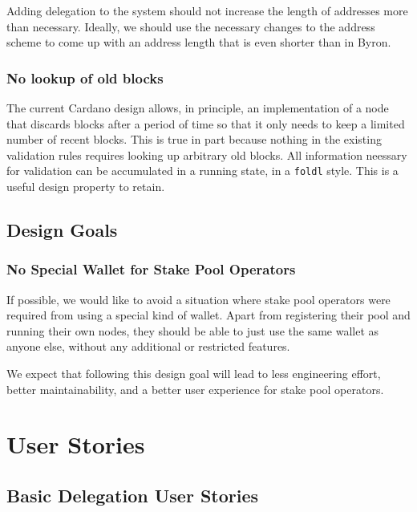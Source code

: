 \documentclass[11pt,a4paper]{article}
\begin{document}
Adding delegation to the system should not increase the length of
addresses more than necessary. Ideally, we should use the necessary
changes to the address scheme to come up with an address length that is
even shorter than in Byron.

\subsubsection{No lookup of old blocks}\label{no-lookup-of-old-blocks}

The current Cardano design allows, in principle, an implementation of a
node that discards blocks after a period of time so that it only needs
to keep a limited number of recent blocks. This is true in part because
nothing in the existing validation rules requires looking up arbitrary
old blocks. All information neessary for validation can be accumulated
in a running state, in a \texttt{foldl} style. This is a useful design
property to retain.

\subsection{Design Goals}\label{design-goals}

\subsubsection{No Special Wallet for Stake Pool
Operators}\label{no-special-wallet-for-stake-pool-operators}

If possible, we would like to avoid a situation where stake pool
operators were required from using a special kind of wallet. Apart from
registering their pool and running their own nodes, they should be able
to just use the same wallet as anyone else, without any additional or
restricted features.

We expect that following this design goal will lead to less engineering
effort, better maintainability, and a better user experience for stake
pool operators.

\section{User Stories}\label{user-stories}

\subsection{Basic Delegation User
Stories}\label{basic-delegation-user-stories}
\end{document}
